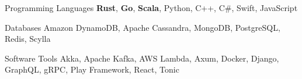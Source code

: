 

\begin{cvskills}

  \cvskill
    {Programming Languages} %
    {{\bf Rust}, {\bf Go}, {\bf Scala}, Python, C++, C\#, Swift, JavaScript} %

  \cvskill
    {Databases} %
    {Amazon DynamoDB, Apache Cassandra, MongoDB, PostgreSQL, Redis, Scylla} %

  \cvskill
    {Software Tools} %
    {Akka, Apache Kafka, AWS Lambda, Axum, Docker, Django, GraphQL, gRPC, Play Framework, React, Tonic} %

\end{cvskills}
